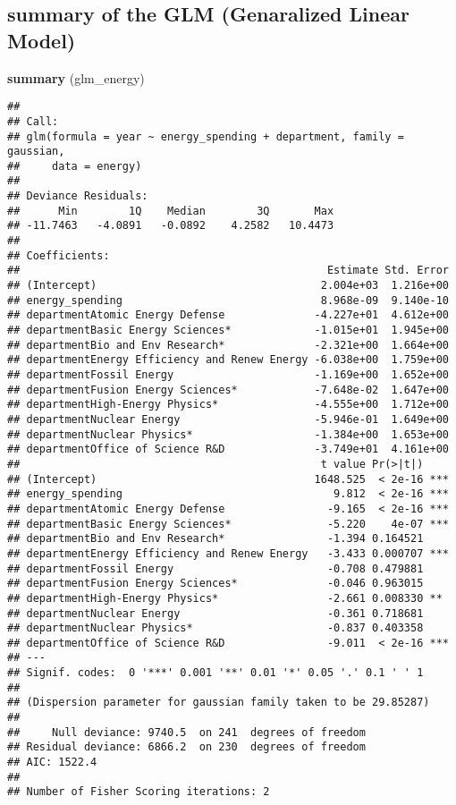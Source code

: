 \documentclass[]{article}
\newenvironment{Shaded}{\begin{snugshade}}{\end{snugshade}}
\newcommand{\KeywordTok}[1]{\textcolor[rgb]{0.13,0.29,0.53}{\textbf{#1}}}
\newcommand{\NormalTok}[1]{#1}
\begin{document}
\subsection{summary of the GLM (Genaralized Linear
Model)}\label{summary-of-the-glm-genaralized-linear-model-1}

\begin{Shaded}
\begin{Highlighting}[]
\KeywordTok{summary}\NormalTok{ (glm_energy)}
\end{Highlighting}
\end{Shaded}

\begin{verbatim}
## 
## Call:
## glm(formula = year ~ energy_spending + department, family = gaussian, 
##     data = energy)
## 
## Deviance Residuals: 
##      Min        1Q    Median        3Q       Max  
## -11.7463   -4.0891   -0.0892    4.2582   10.4473  
## 
## Coefficients:
##                                                Estimate Std. Error
## (Intercept)                                   2.004e+03  1.216e+00
## energy_spending                               8.968e-09  9.140e-10
## departmentAtomic Energy Defense              -4.227e+01  4.612e+00
## departmentBasic Energy Sciences*             -1.015e+01  1.945e+00
## departmentBio and Env Research*              -2.321e+00  1.664e+00
## departmentEnergy Efficiency and Renew Energy -6.038e+00  1.759e+00
## departmentFossil Energy                      -1.169e+00  1.652e+00
## departmentFusion Energy Sciences*            -7.648e-02  1.647e+00
## departmentHigh-Energy Physics*               -4.555e+00  1.712e+00
## departmentNuclear Energy                     -5.946e-01  1.649e+00
## departmentNuclear Physics*                   -1.384e+00  1.653e+00
## departmentOffice of Science R&D              -3.749e+01  4.161e+00
##                                               t value Pr(>|t|)    
## (Intercept)                                  1648.525  < 2e-16 ***
## energy_spending                                 9.812  < 2e-16 ***
## departmentAtomic Energy Defense                -9.165  < 2e-16 ***
## departmentBasic Energy Sciences*               -5.220    4e-07 ***
## departmentBio and Env Research*                -1.394 0.164521    
## departmentEnergy Efficiency and Renew Energy   -3.433 0.000707 ***
## departmentFossil Energy                        -0.708 0.479881    
## departmentFusion Energy Sciences*              -0.046 0.963015    
## departmentHigh-Energy Physics*                 -2.661 0.008330 ** 
## departmentNuclear Energy                       -0.361 0.718681    
## departmentNuclear Physics*                     -0.837 0.403358    
## departmentOffice of Science R&D                -9.011  < 2e-16 ***
## ---
## Signif. codes:  0 '***' 0.001 '**' 0.01 '*' 0.05 '.' 0.1 ' ' 1
## 
## (Dispersion parameter for gaussian family taken to be 29.85287)
## 
##     Null deviance: 9740.5  on 241  degrees of freedom
## Residual deviance: 6866.2  on 230  degrees of freedom
## AIC: 1522.4
## 
## Number of Fisher Scoring iterations: 2
\end{verbatim}
\end{document}
